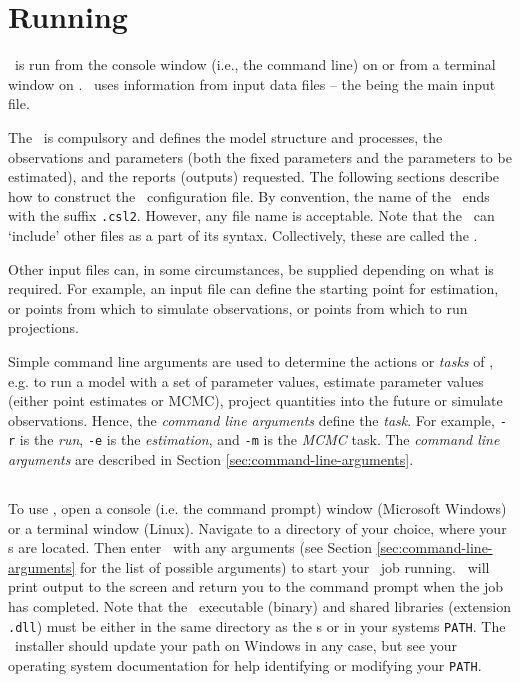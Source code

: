 \section{Running \CNAME\label{sec:running}}

\CNAME\ is run from the console window (i.e., the command line) on  or from a terminal window on . \CNAME\ uses information from input data files -- the \emph{\config{}} being the main input file. 

The \config\ is compulsory and defines the model structure and processes, the observations and  parameters (both the fixed parameters and the parameters to be estimated), and the reports (outputs) requested. The following sections  describe how to construct the \CNAME\ configuration file. By convention, the name of the \config\ ends with the suffix \texttt{.csl2}. However, any file name is acceptable. Note that the \config\ can `include' other files as a part of its syntax. Collectively, these are called the \config.

Other input files can, in some circumstances, be supplied depending on what is required. For example, an input file can define the starting point for estimation, or points from which to simulate observations, or points from which to run projections.

Simple command line arguments are used to determine the actions or \emph{tasks} of \CNAME, e.g. to run a model with a set of parameter values, estimate parameter values (either point estimates or MCMC), project quantities into the future or simulate observations. Hence, the \emph{command line arguments} define the \emph{task}. For example, \texttt{-r} is the \emph{run}, \texttt{-e} is the \emph{estimation}, and \texttt{-m} is the \emph{MCMC} task. The \emph{command line arguments} are described in Section \ref{sec:command-line-arguments}.

\subsection{}

To use \CNAME, open a console (i.e. the command prompt) window (Microsoft Windows) or a terminal window (Linux). Navigate to a directory of your choice, where your \config s are located. Then enter \cname\ with any arguments (see Section \ref{sec:command-line-arguments} for the list of possible arguments) to start your \CNAME\ job running. \CNAME\ will print output to the screen and return you to the command prompt when the job has completed. Note that the \CNAME\ executable (binary) and shared libraries (extension \texttt{.dll}) must be either in the same directory as the \config s or in your systems \texttt{PATH}. The \CNAME\ installer should update your path on Windows in any case, but see your operating system documentation for help identifying or modifying your \texttt{PATH}.

